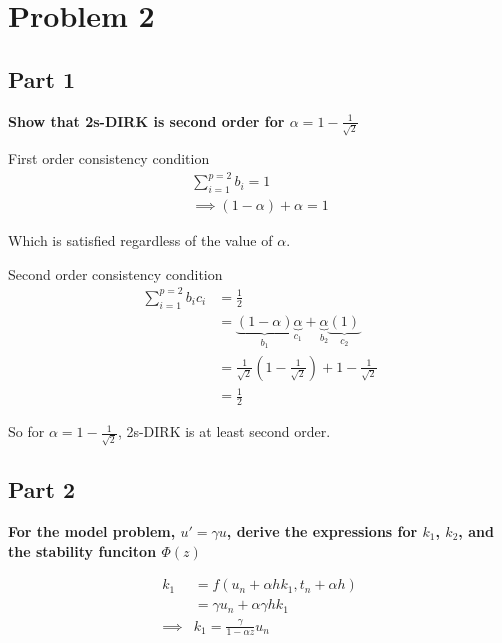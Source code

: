 \documentclass[12pt,a4paper]{article}
\begin{document}
\section{Problem 2}%
\label{sec:problem_2}

\subsection{Part 1}%
\label{sub:part_1}

\textbf{Show that 2s-DIRK is second order for $ \alpha = 1- \frac{1}{ \sqrt{2}}$} 

\par First order consistency condition 
\begin{align*}
  \sum^{p=2}_{i=1} b_i = 1 \\
  \implies (1 - \alpha) + \alpha = 1
\end{align*}

Which is satisfied regardless of the value of $ \alpha$.
\vspace{15px}
\par Second order consistency condition
\begin{align*}
  \sum^{p=2}_{i=1} b_i c_i &= \frac{1}{2} \\
  &= \underbrace{(1- \alpha)}_{b_1} \underbrace{\alpha}_{c_1}
  + \underbrace{\alpha}_{b_2} \underbrace{(1)}_{c_2} \\
  &= \frac{1}{\sqrt{2}} \left(1 - \frac{1}{\sqrt{2}}\right)
  + 1 - \frac{1}{\sqrt{2}} \\
  &= \frac{1}{2}
\end{align*}

So for $ \alpha = 1 - \frac{1}{\sqrt{2}}$, 2s-DIRK is at least second order.

\subsection{Part 2}%
\label{sub:part_2}

\par \textbf{For the model problem, $u' = \gamma u$, derive the expressions for
$k_1$, $k_2$, and the stability funciton $\Phi(z)$} 

\begin{align*}
  k_1 &= f(u_n + \alpha h k_1, t_n + \alpha h ) \\
      &= \gamma u_n + \alpha \gamma h k_1 \\
  \implies &\boxed{k_1 = \frac{ \gamma}{1- \alpha z }u_n}
\end{align*}
\end{document}

